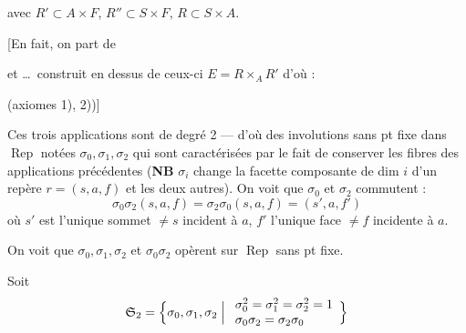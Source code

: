 \documentclass[11pt,a4paper]{article}
\begin{document}
avec $R' \subset A \times F$, $R'' \subset S \times F$, $R \subset S \times A$.

[En fait, on part de


et …\ construit en dessus de ceux-ci $E = R \times_A R'$ d'où :


(axiomes 1), 2))]

Ces trois applications sont de degré 2 --- d'où des involutions sans pt
fixe dans $\operatorname{Rep}$ notées $\sigma_0, \sigma_1, \sigma_2$ qui sont
caractérisées par le fait de conserver les fibres des applications
précédentes (\textbf{NB} $\sigma_i$ change la facette composante de dim $i$
d'un repère $r = (s, a, f)$ et  les deux autres). On
voit que $\sigma_0$ et $\sigma_2$ \struck{\ill{}} commutent :
\[
  \sigma_0\sigma_2(s, a, f) = \sigma_2\sigma_0(s, a, f) = (s', a, f')
\]
où $s'$ est l'unique sommet $\neq s$ incident à $a$, $f'$ l'unique face
$\neq f$ incidente à $a$.

On voit que $\sigma_0, \sigma_1, \sigma_2$ et $\sigma_0\sigma_2$ opèrent sur
$\operatorname{Rep}$ sans pt fixe.

Soit
\[
  \mathfrak{S}_2 = \Bigl\{ \sigma_0, \sigma_1, \sigma_2 \Bigm|
  \begin{array}{l}
    \sigma_0^2 = \sigma_1^2 = \sigma_2^2 = 1 \\
    \sigma_0\sigma_2 = \sigma_2\sigma_0
  \end{array} \Bigr\}
\]
\end{document}
